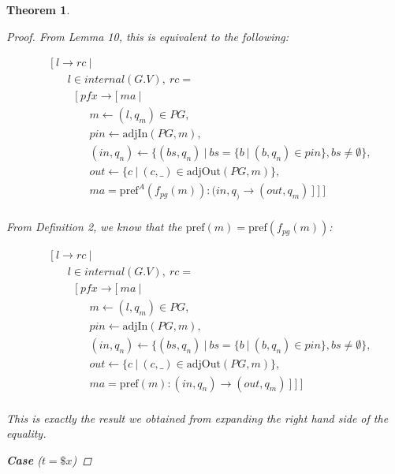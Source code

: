 \documentclass[twocolumn, openany]{sig-alternate-10pt}
\newcommand{\Pref}{\ensuremath{\mathrm{pref}}}
\newtheorem{thm}{Theorem}
\begin{document}
\begin{thm}
\begin{proof}
  From Lemma 10, this is equivalent to the following:

    \[ \begin{array}{l}
     ~~~~~ [~ l \rightarrow rc ~\vert~ \\
     ~~~~~~~~~~~~ l \in internal(G.V), ~rc =  \\
     ~~~~~~~~~~~~~~~ [~ pfx \rightarrow [~ ma ~\vert~ \\
     ~~~~~~~~~~~~~~~~~~~~~ m \leftarrow (l,q_m) \in PG, \\
     ~~~~~~~~~~~~~~~~~~~~~ pin \leftarrow \text{adjIn}(PG,m), \\
     ~~~~~~~~~~~~~~~~~~~~~ (in,q_n) \leftarrow \{ (bs,q_n) ~\vert~ bs=\{b ~\vert~ (b,q_n) \in pin \}, bs \neq \emptyset \}, \\
     ~~~~~~~~~~~~~~~~~~~~~ out \leftarrow \{ c ~\vert~ (c,\_) \in \text{adjOut}(PG,m) \}, \\
     ~~~~~~~~~~~~~~~~~~~~~ ma = \Pref^A(f_{pg}(m)) : (in,q_) \rightarrow (out,q_m) ~] ~] ~]\\
  \end{array} \]%

  From Definition 2, we know that the $\Pref(m) = \Pref(f_{pg}(m))$:

    \[ \begin{array}{l}
     ~~~~~ [~ l \rightarrow rc ~\vert~ \\
     ~~~~~~~~~~~~ l \in internal(G.V), ~rc =  \\
     ~~~~~~~~~~~~~~~ [~ pfx \rightarrow [~ ma ~\vert~ \\
     ~~~~~~~~~~~~~~~~~~~~~ m \leftarrow (l,q_m) \in PG, \\
     ~~~~~~~~~~~~~~~~~~~~~ pin \leftarrow \text{adjIn}(PG,m), \\
     ~~~~~~~~~~~~~~~~~~~~~ (in,q_n) \leftarrow \{ (bs,q_n) ~\vert~ bs=\{b ~\vert~ (b,q_n) \in pin \}, bs \neq \emptyset \}, \\
     ~~~~~~~~~~~~~~~~~~~~~ out \leftarrow \{ c ~\vert~ (c,\_) \in \text{adjOut}(PG,m) \}, \\
     ~~~~~~~~~~~~~~~~~~~~~ ma = \Pref(m) : (in,q_n) \rightarrow (out,q_m) ~] ~] ~]\\
  \end{array} \]%

  This is exactly the result we obtained from expanding the right hand side of the equality.

  \vspace{.4em}
  \textbf{Case} ($t = \$x$)
  \vspace{.4em}


\end{proof}
\end{thm}
\end{document}
